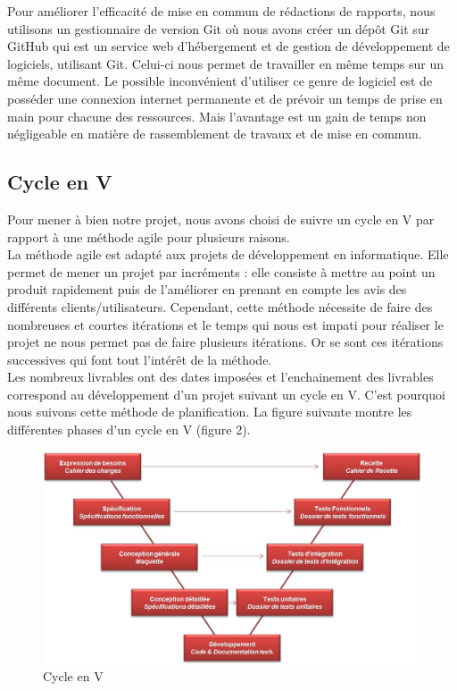 \documentclass[a4paper]{article}
\begin{document}
	Pour améliorer l'efficacité de mise en commun de rédactions de rapports, nous utilisons un gestionnaire de version Git où nous avons créer un dépôt Git sur GitHub qui est un service web d'hébergement et de gestion de développement de logiciels, utilisant Git. Celui-ci nous permet de travailler en même temps sur un même document. Le possible inconvénient d'utiliser ce genre de logiciel est de posséder une connexion internet permanente et de prévoir un temps de prise en main pour chacune des ressources. Mais l'avantage est un gain de temps non négligeable en matière de rassemblement de travaux et de mise en commun.

	\subsection{Cycle en V}
	
	Pour mener à bien notre projet, nous avons choisi de suivre un cycle en V par rapport à une méthode agile pour plusieurs raisons.\\
	
	La méthode agile est adapté aux projets de développement en informatique. Elle permet de mener un projet par incréments : elle consiste à mettre au point un produit rapidement puis de l'améliorer en prenant en compte les avis des différents clients/utilisateurs. Cependant, cette méthode nécessite de faire des nombreuses et courtes itérations et le temps qui nous est impati pour réaliser le projet ne nous permet pas de faire plusieurs itérations. Or se sont ces itérations successives qui font tout l'intérêt de la méthode.\\
	
	Les nombreux livrables ont des dates imposées et l'enchainement des livrables correspond au développement d'un projet suivant un cycle en V. C'est pourquoi nous suivons cette méthode de planification. La figure suivante montre les différentes phases d'un cycle en V (figure 2).\\
	
\begin{figure}[H]
\centering
\includegraphics[width=\textwidth]{Cycle_en_V.jpg}
\caption{Cycle en V}
\label{fig:cycleenv}
\end{figure}
	
\end{document}
